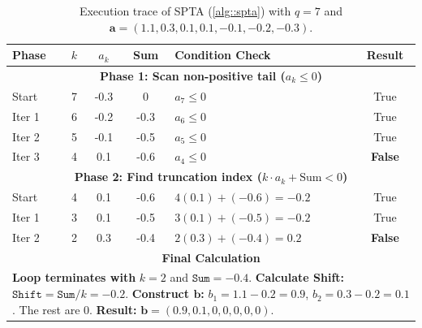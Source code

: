 \documentclass[noinfoline]{imsart}\setcounter{tocdepth}{2}
\newcommand{\m}[1]{\mathbf{#1}} %
\theoremstyle{plain}
\begin{document}
\begin{appendix}
\begin{table}[h!]
\centering
\caption{Execution trace of SPTA (\cref{alg::spta}) with $q=7$ and $\m{a} = (1.1, 0.3, 0.1, 0.1, -0.1, -0.2, -0.3)$.}
\label{tab:spta_optimized_trace}
\begin{tabular}{|l|c|c|c|l|c|}
\hline
\textbf{Phase} & $k$ & \textbf{$a_k$} & \textbf{Sum} & \textbf{Condition Check} & \textbf{Result} \\ \hline
\multicolumn{6}{|c|}{\textbf{Phase 1: Scan non-positive tail ($a_k \le 0$)}} \\ \hline
Start & 7 & -0.3 & 0 & $a_7 \le 0$ & True \\
Iter 1 & 6 & -0.2 & -0.3 & $a_6 \le 0$ & True \\
Iter 2 & 5 & -0.1 & -0.5 & $a_5 \le 0$ & True \\
Iter 3 & 4 & 0.1 & -0.6 & $a_4 \le 0$ & \textbf{False} \\ \hline
\multicolumn{6}{|c|}{\textbf{Phase 2: Find truncation index ($k \cdot a_k + \text{Sum} < 0$)}} \\ \hline
Start & 4 & 0.1 & -0.6 & $4(0.1)+(-0.6) = -0.2$ & True \\
Iter 1 & 3 & 0.1 & -0.5 & $3(0.1)+(-0.5) = -0.2$ & True \\
Iter 2 & 2 & 0.3 & -0.4 & $2(0.3)+(-0.4) = 0.2$ & \textbf{False} \\ \hline
\multicolumn{6}{|c|}{\textbf{Final Calculation}} \\ \hline
\multicolumn{6}{|p{12cm}|}{ \textbf{Loop terminates with} $k=2$ and $\texttt{Sum}=-0.4$. \newline \textbf{Calculate Shift:} $\texttt{Shift} = \texttt{Sum} / k = -0.2$. \newline 
\textbf{Construct $\m{b}$:} $b_1 = 1.1 - 0.2 = 0.9$, $b_2 = 0.3 - 0.2 = 0.1$. The rest are 0. \newline 
\textbf{Result:} $\m{b} = (0.9, 0.1, 0, 0, 0, 0, 0)$. } \\ \hline
\end{tabular}
\end{table}


\end{appendix}
\end{document}
